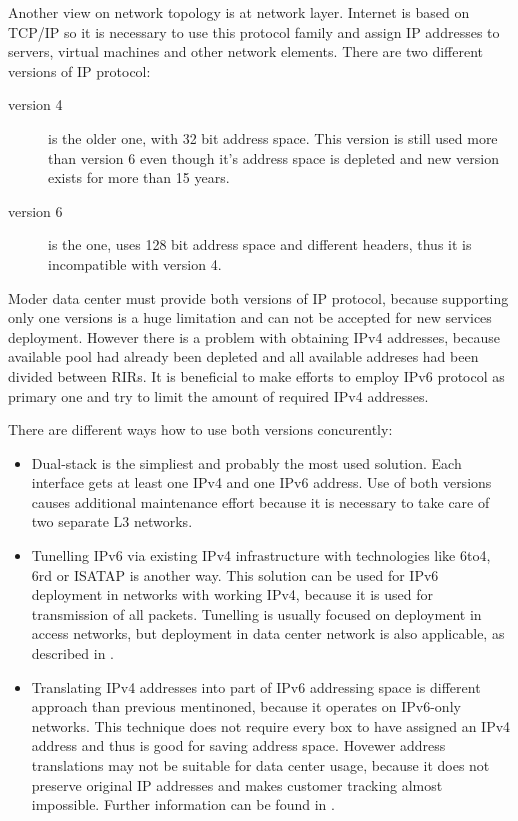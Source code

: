 Another view on network topology is at network layer. Internet is based on \Ac{TCP}/\Ac{IP} so it is necessary to use this protocol family and assign \Ac{IP} addresses to servers, virtual machines and other network elements. There are two different versions of \Ac{IP} protocol:
\begin{description}
	\item[version 4] is the older one, with 32 bit address space. This version is still used more than version 6 even though it's address space is depleted and new version exists for more than 15 years.
	\item[version 6] is the  one, uses 128 bit address space and different headers, thus it is incompatible with version 4.
\end{description}

Moder data center must provide both versions of \Ac{IP} protocol, because supporting only one versions is a huge limitation and can not be accepted for new services deployment. 
However there is a problem with obtaining \Ac{IPv4} addresses, because available pool had already been depleted and all available addreses had been divided between \Ac{RIR}s. It is beneficial to make efforts to employ \Ac{IPv6} protocol as primary one and try to limit the amount of required \Ac{IPv4} addresses.


There are different ways how to use both versions concurently:
\begin{itemize}
	\item Dual-stack is the simpliest and probably the most used solution. Each interface gets at least one \Ac{IPv4} and one \Ac{IPv6} address. Use of both versions causes additional maintenance effort because it is necessary to take care of two separate L3 networks.
	\item Tunelling \Ac{IPv6} via existing \Ac{IPv4} infrastructure with technologies like 6to4, 6rd or \Ac{ISATAP} is another way. This solution can be used for \Ac{IPv6} deployment in networks with working \Ac{IPv4}, because it is used for transmission of all packets. 
	Tunelling is usually focused on deployment in access networks, but deployment in data center network is also applicable, as described in \cite{draft-sakura-6rd}.
	\item Translating \Ac{IPv4} addresses into part of \Ac{IPv6} addressing space is different approach than previous mentinoned, because it operates on \Ac{IPv6}-only networks. This technique does not require every box to have assigned an \Ac{IPv4} address and thus is good for saving address space. Hovewer address translations may not be suitable for data center usage, because it does not preserve original \Ac{IP} addresses and makes customer tracking almost impossible. Further information can be found in \cite{ipv4-jako-sluzba}.
\end{itemize}

